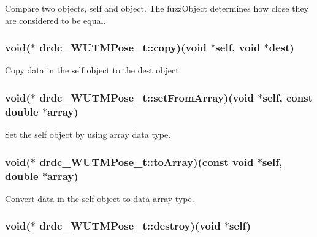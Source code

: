 Compare two objects, self and object. The fuzzObject determines how close they are considered to be equal. 

\hypertarget{structdrdc__WUTMPose__t_9bf102e4e4c1777f04ddd277c05ba933}{
\subsubsection[copy]{\setlength{\rightskip}{0pt plus 5cm}void($\ast$ {\bf drdc\_\-WUTMPose\_\-t::copy})(void $\ast$self, void $\ast$dest)}}
\label{structdrdc__WUTMPose__t_9bf102e4e4c1777f04ddd277c05ba933}


Copy data in the self object to the dest object. 

\hypertarget{structdrdc__WUTMPose__t_f75ed59f418f9115176b27bddc12b14e}{
\subsubsection[setFromArray]{\setlength{\rightskip}{0pt plus 5cm}void($\ast$ {\bf drdc\_\-WUTMPose\_\-t::setFromArray})(void $\ast$self, const double $\ast$array)}}
\label{structdrdc__WUTMPose__t_f75ed59f418f9115176b27bddc12b14e}


Set the self object by using array data type. 

\hypertarget{structdrdc__WUTMPose__t_9f10e14e23df81e7cdab8cd7ec81969c}{
\subsubsection[toArray]{\setlength{\rightskip}{0pt plus 5cm}void($\ast$ {\bf drdc\_\-WUTMPose\_\-t::toArray})(const void $\ast$self, double $\ast$array)}}
\label{structdrdc__WUTMPose__t_9f10e14e23df81e7cdab8cd7ec81969c}


Convert data in the self object to data array type. 

\hypertarget{structdrdc__WUTMPose__t_ae4fd2fd1d355dfbdc6c3fff7c4859fe}{
\subsubsection[destroy]{\setlength{\rightskip}{0pt plus 5cm}void($\ast$ {\bf drdc\_\-WUTMPose\_\-t::destroy})(void $\ast$self)}}
\label{structdrdc__WUTMPose__t_ae4fd2fd1d355dfbdc6c3fff7c4859fe}



